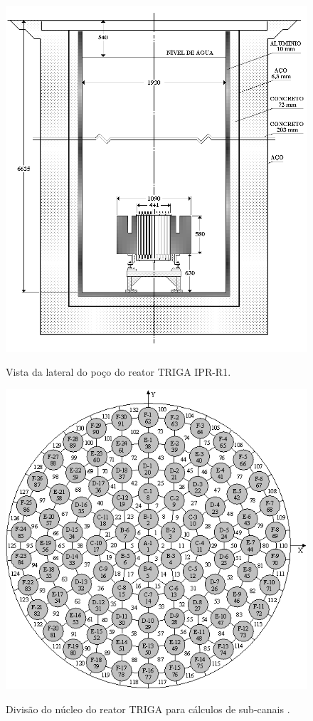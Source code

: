 \begin{figure}[htb]
  \caption{Vista da lateral do poço do reator TRIGA IPR-R1.}
  \centering\includegraphics[scale=0.35]{figuras/poco_triga.png}
  \label{fig:poco_triga}
\end{figure}

\begin{figure}[htb]
  \caption[Divisão do núcleo do reator TRIGA para cálculos de sub-canais.]{Divisão do núcleo do reator TRIGA para cálculos de sub-canais \cite{Veloso2005}.}
  \centering\includegraphics[scale=0.6]{figuras/subcanais_veloso.png}
  \label{fig:subcanais_veloso}
\end{figure}

